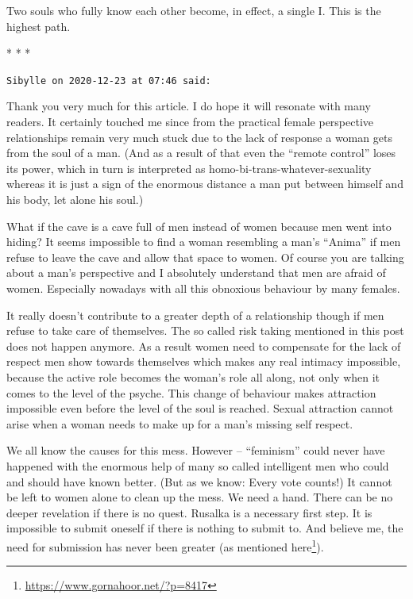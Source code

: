Two souls who fully know each other become, in effect, a single I. This is the highest path.




\begin{center}* * *\end{center}

\begin{footnotesize}\begin{sffamily}



\texttt{Sibylle on 2020-12-23 at 07:46 said: }

Thank you very much for this article. I do hope it will resonate with many readers. It certainly touched me since from the practical female perspective relationships remain very much stuck due to the lack of response a woman gets from the soul of a man. (And as a result of that even the “remote control” loses its power, which in turn is interpreted as homo-bi-trans-whatever-sexuality whereas it is just a sign of the enormous distance a man put between himself and his body, let alone his soul.)

What if the cave is a cave full of men instead of women because men went into hiding? It seems impossible to find a woman resembling a man's “Anima” if men refuse to leave the cave and allow that space to women. Of course you are talking about a man's perspective and I absolutely understand that men are afraid of women. Especially nowadays with all this obnoxious behaviour by many females.

It really doesn't contribute to a greater depth of a relationship though if men refuse to take care of themselves. The so called risk taking mentioned in this post does not happen anymore. As a result women need to compensate for the lack of respect men show towards themselves which makes any real intimacy impossible, because the active role becomes the woman's role all along, not only when it comes to the level of the psyche. This change of behaviour makes attraction impossible even before the level of the soul is reached. Sexual attraction cannot arise when a woman needs to make up for a man's missing self respect.

We all know the causes for this mess. However – “feminism” could never have happened with the enormous help of many so called intelligent men who could and should have known better. (But as we know: Every vote counts!) It cannot be left to women alone to clean up the mess. We need a hand. There can be no deeper revelation if there is no quest. Rusalka is a necessary first step. It is impossible to submit oneself if there is nothing to submit to. And believe me, the need for submission has never been greater (as mentioned here\footnote{\url{https://www.gornahoor.net/?p=8417}}).


\end{sffamily}
\end{footnotesize}
